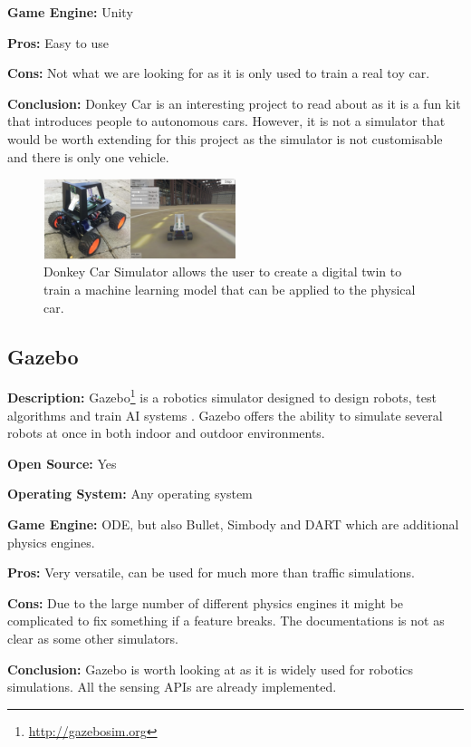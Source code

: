 \textbf{Game Engine:} Unity

\textbf{Pros:} Easy to use

\textbf{Cons:} Not what we are looking for as it is only used to train a real toy car.

\textbf{Conclusion:} Donkey Car is an interesting project to read about as it is a fun kit that introduces people to autonomous cars. However, it is not a simulator that would be worth extending for this project as the simulator is not customisable and there is only one vehicle. 


\begin{figure}[H]
    \centering
    \includegraphics[width=0.5\textwidth]{03_Background/Appendix/Simulators/DonkeySim.jpg}
    \caption{Donkey Car Simulator allows the user to create a digital twin to train a machine learning model that can be applied to the physical car.}
\end{figure}

\subsection{Gazebo}\label{gazebo}
\textbf{Description:} Gazebo\footnote{\url{http://gazebosim.org}} is a robotics simulator designed to design robots, test algorithms and train AI systems \cite{Gazebo_Website}. Gazebo offers the ability to simulate several robots at once in both indoor and outdoor environments.

\textbf{Open Source:} Yes

\textbf{Operating System:} Any operating system

\textbf{Game Engine:} ODE, but also Bullet, Simbody and DART which are additional physics engines. 

\textbf{Pros:} Very versatile, can be used for much more than traffic simulations. 

\textbf{Cons:} Due to the large number of different physics engines it might be complicated to fix something if a feature breaks. The documentations is not as clear as some other simulators. 

\textbf{Conclusion:} Gazebo is worth looking at as it is widely used for robotics simulations. All the sensing APIs are already implemented.


